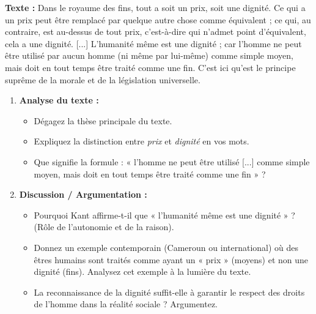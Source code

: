 \documentclass[11pt]{article}
\begin{document}
\begin{exercice}
\textbf{Texte :}
\og Dans le royaume des fins, tout a soit un prix, soit une dignité. Ce qui a un prix peut être remplacé par quelque autre chose comme équivalent ; ce qui, au contraire, est au-dessus de tout prix, c'est-à-dire qui n'admet point d'équivalent, cela a une dignité. [...]
L'humanité même est une dignité ; car l'homme ne peut être utilisé par aucun homme (ni même par lui-même) comme simple moyen, mais doit en tout temps être traité comme une fin. C'est ici qu'est le principe suprême de la morale et de la législation universelle. \fg
\begin{enumerate}
    \item \textbf{Analyse du texte :}
    \begin{itemize}
        \item[a)] Dégagez la thèse principale du texte.
        \item[b)] Expliquez la distinction entre \emph{prix} et \emph{dignité} en vos mots.
        \item[c)] Que signifie la formule : « l'homme ne peut être utilisé [...] comme simple moyen, mais doit en tout temps être traité comme une fin » ?
    \end{itemize}
    \item \textbf{Discussion / Argumentation :}
    \begin{itemize}
        \item[a)] Pourquoi Kant affirme-t-il que « l'humanité même est une dignité » ? (Rôle de l'autonomie et de la raison).
        \item[b)] Donnez un exemple contemporain (Cameroun ou international) où des êtres humains sont traités comme ayant un « prix » (moyens) et non une dignité (fins). Analysez cet exemple à la lumière du texte.
        \item[c)] La reconnaissance de la dignité suffit-elle à garantir le respect des droits de l'homme dans la réalité sociale ? Argumentez.
    \end{itemize}
\end{enumerate}
\end{exercice}
\end{document}

